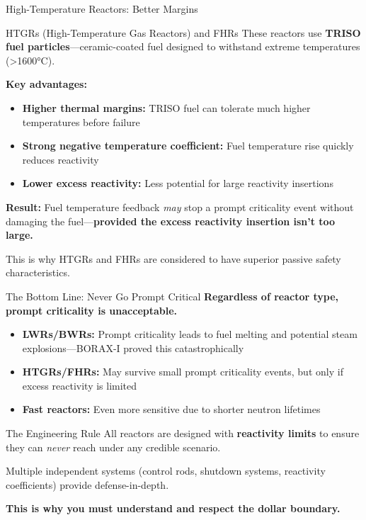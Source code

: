 \documentclass[aspectratio=169]{beamer}
\begin{document}
\begin{frame}[allowframebreaks]{High-Temperature Reactors: Better Margins}
    \begin{block}{HTGRs (High-Temperature Gas Reactors) and FHRs}
        These reactors use \textbf{TRISO fuel particles}—ceramic-coated fuel designed to withstand extreme temperatures (\textgreater 1600°C).
        
        \textbf{Key advantages:}
        \begin{itemize}
            \item \textbf{Higher thermal margins:} TRISO fuel can tolerate much higher temperatures before failure
            \item \textbf{Strong negative temperature coefficient:} Fuel temperature rise quickly reduces reactivity
            \item \textbf{Lower excess reactivity:} Less potential for large reactivity insertions
        \end{itemize}

        \textbf{Result:} Fuel temperature feedback \textit{may} stop a prompt criticality event without damaging the fuel—\textbf{provided the excess reactivity insertion isn't too large.}
    \end{block}

    This is why HTGRs and FHRs are considered to have superior passive safety characteristics.
\end{frame}

\begin{frame}[allowframebreaks]{The Bottom Line: Never Go Prompt Critical}
    \textbf{Regardless of reactor type, prompt criticality is unacceptable.}

    \vspace{1em}
    \begin{itemize}
        \item \textbf{LWRs/BWRs:} Prompt criticality leads to fuel melting and potential steam explosions—BORAX-I proved this catastrophically \cite{putman2012criticality}
        \item \textbf{HTGRs/FHRs:} May survive small prompt criticality events, but only if excess reactivity is limited
        \item \textbf{Fast reactors:} Even more sensitive due to shorter neutron lifetimes
    \end{itemize}

    \vspace{1em}
    \begin{alertblock}{The Engineering Rule}
        All reactors are designed with \textbf{reactivity limits} to ensure they can \textit{never} reach  under any credible scenario.
        
        Multiple independent systems (control rods, shutdown systems, reactivity coefficients) provide defense-in-depth.
    \end{alertblock}

    \textbf{This is why you must understand and respect the dollar boundary.}
\end{frame}
\end{document}
